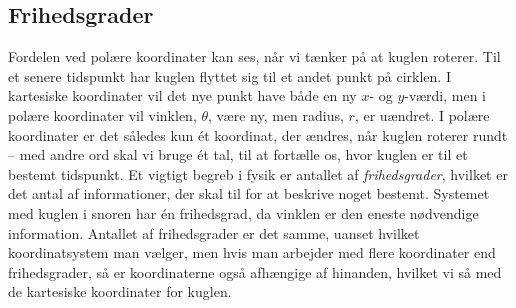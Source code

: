 \subsection{Frihedsgrader}
Fordelen ved polære koordinater kan ses, når vi tænker på at kuglen roterer. Til et senere tidspunkt har kuglen flyttet sig til et andet punkt på cirklen. I kartesiske koordinater vil det nye punkt have både en ny $x$- og $y$-værdi, men i polære koordinater vil vinklen, $\theta$, være ny, men radius, $r$, er uændret. I polære koordinater er det således kun ét koordinat, der ændres, når kuglen roterer rundt -- med andre ord skal vi bruge ét tal, til at fortælle os, hvor kuglen er til et bestemt tidspunkt. Et vigtigt begreb i fysik er antallet af \textit{frihedsgrader}, hvilket er det antal af informationer, der skal til for at beskrive noget bestemt. Systemet med kuglen i snoren har én frihedsgrad, da vinklen er den eneste nødvendige information. Antallet af frihedsgrader er det samme, uanset hvilket koordinatsystem man vælger, men hvis man arbejder med flere koordinater end frihedsgrader, så er koordinaterne også afhængige af hinanden, hvilket vi så med de kartesiske koordinater for kuglen.%

